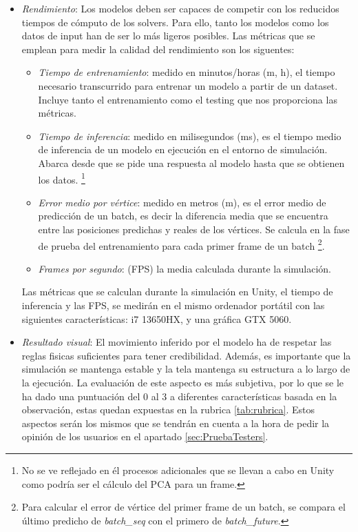 \begin{itemize}
  \item \textit{Rendimiento}: Los modelos deben ser capaces de competir con los reducidos tiempos de cómputo de los solvers. Para ello, tanto los modelos como los datos de input han de ser lo más ligeros posibles. Las métricas que se emplean para medir la calidad del rendimiento son los siguentes: 
  \begin{itemize}
    \item \textit{Tiempo de entrenamiento}: medido en minutos/horas (m, h), el tiempo necesario transcurrido para entrenar un modelo a partir de un dataset. Incluye tanto el entrenamiento como el testing que nos proporciona las métricas. 
    \item \textit{Tiempo de inferencia}: medido en milisegundos (ms), es el tiempo medio de inferencia de un modelo en ejecución en el entorno de simulación. Abarca desde que se pide una respuesta al modelo hasta que se obtienen los datos. \footnote{No se ve reflejado en él procesos adicionales que se llevan a cabo en Unity como podría ser el cálculo del PCA para un frame.}
    \item \textit{Error medio por vértice}: medido en metros (m), es el error medio de predicción de un batch, es decir la diferencia media que se encuentra entre las posiciones predichas y reales de los vértices. Se calcula en la fase de prueba del entrenamiento para cada primer frame de un batch \footnote{Para calcular el error de vértice del primer frame de un batch, se compara el último predicho de \textit{batch\_seq} con el primero de \textit{batch\_future}.}.
    \item \textit{Frames por segundo}: (FPS) la media calculada durante la simulación. 
  \end{itemize}
    Las métricas que se calculan durante la simulación en Unity, el tiempo de inferencia y las FPS, se medirán en el mismo ordenador portátil con las siguientes características: i7 13650HX, y una gráfica GTX 5060.
  \item \textit{Resultado visual}: El movimiento inferido por el modelo ha de respetar las reglas fisicas suficientes para tener credibilidad. Además, es importante que la simulación se mantenga estable y la tela mantenga su estructura a lo largo de la ejecución. La evaluación de este aspecto es más subjetiva, por lo que se le ha dado una puntuación del 0 al 3 a diferentes características basada en la observación, estas quedan expuestas en la rubrica \ref{tab:rubrica}. Estos aspectos serán los mismos que se tendrán en cuenta a la hora de pedir la opinión de los usuarios en el apartado \ref{sec:PruebaTesters}.

\end{itemize}
